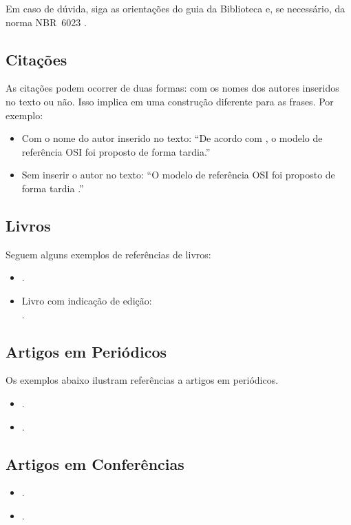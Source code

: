 Em caso de dúvida, siga as orientações do guia da Biblioteca \cite{Biblioteca12} e, se necessário, da norma NBR~6023 \cite{NBR6023:2002}.

\subsection{Citações}
As citações podem ocorrer de duas formas: com os nomes dos autores inseridos no texto ou não.  Isso implica em uma construção diferente para as frases.  Por exemplo:
\begin{itemize}
	\item Com o nome do autor inserido no texto: ``De acordo com , o modelo de referência OSI foi proposto de forma tardia.''
	\item Sem inserir o autor no texto: ``O modelo de referência OSI foi proposto de forma tardia \cite{Tanenbaum03}.''
\end{itemize}

\subsection{Livros}
Seguem alguns exemplos de referências de livros:
\begin{itemize}
	\item {}.
	\item Livro com indicação de edição:\\
	.
\end{itemize}

\subsection{Artigos em Periódicos}
Os exemplos abaixo ilustram referências a artigos em periódicos.
\begin{itemize}
	\item {}.
	\item {}.
\end{itemize}

\subsection{Artigos em Conferências}
\begin{itemize}
	\item {}.
	\item {}.
\end{itemize}

